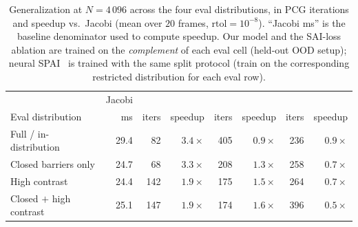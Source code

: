 \documentclass[acmtog,anonymous,review]{acmart}
\theoremstyle{plain}
\begin{document}
\begin{table}[t]
\centering
\caption{Generalization at $N\!=\!4\,096$ across the four eval distributions, in
PCG iterations and speedup vs.\ Jacobi (mean over $20$ frames,
$\mathrm{rtol}\!=\!10^{-8}$). ``Jacobi ms'' is the baseline denominator used to
compute speedup. Our model and the SAI-loss ablation are trained on the
\emph{complement} of each eval cell (held-out OOD setup); neural
SPAI~\cite{Yang2025sparse} is trained with the same split protocol
(train on the corresponding restricted distribution for each eval row).}
\label{tab:generalization-vs-baselines}
\scriptsize\setlength{\tabcolsep}{3pt}
\begin{tabular}{@{}l r rr rr rr@{}}
\toprule
& Jacobi
& 
& 
&  \\
\cmidrule(lr){2-2}\cmidrule(lr){3-4}\cmidrule(lr){5-6}\cmidrule(lr){7-8}
Eval distribution         & ms & iters & speedup & iters & speedup & iters & speedup \\
\midrule
Full / in-distribution    & 29.4 & 82  & \textbf{$3.4\times$} & 405 & $0.9\times$ & 236 & $0.9\times$ \\
Closed barriers only      & 24.7 & 68  & \textbf{$3.3\times$} & 208 & $1.3\times$ & 258 & $0.7\times$ \\
High contrast             & 24.4 & 142 & \textbf{$1.9\times$} & 175 & $1.5\times$ & 264 & $0.7\times$ \\
Closed $+$ high contrast  & 25.1 & 147 & \textbf{$1.9\times$} & 174 & $1.6\times$ & 396 & $0.5\times$ \\
\bottomrule
\end{tabular}
\end{table}
\end{document}
